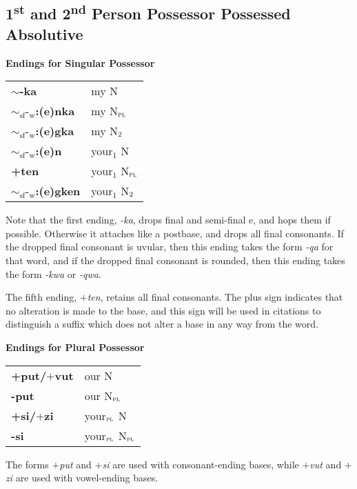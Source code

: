 \documentclass{article}
\begin{document}
\subsection{1\textsuperscript{st} and 2\textsuperscript{nd} Person Possessor Possessed Absolutive}

\textbf{Endings for Singular Possessor}

\begin{tabular}{ l l }
\textbf{$\sim$-ka} & my N \\ 
\textbf{${\sim}_\text{sf}\text{-}_\text{w}$:(e)nka} & my N$_\text{\textsc{pl}}$ \\  
\textbf{${\sim}_\text{sf}\text{-}_\text{w}$:(e)gka} & my N$_\text{\textsc{2}}$ \\  
\textbf{${\sim}_\text{sf}\text{-}_\text{w}$:(e)n} & your$_1$ N \\  
\textbf{+ten} & your$_1$ N$_\text{\textsc{pl}}$ \\
\textbf{${\sim}_\text{sf}\text{-}_\text{w}$:(e)gken} & your$_1$ N$_\text{\textsc{2}}$ \\  
\end{tabular}

\vspace{12pt}

Note that the first ending, \textit{-ka}, drops final and semi-final e, and hops them if possible.
%
Otherwise it attaches like a postbase, and drops all final consonants.
%
If the dropped final consonant is uvular, then this ending takes the form \textit{-qa} for that word, and if the dropped final consonant is rounded, then this ending takes the form \textit{-kwa} or \textit{-qwa}.

The fifth ending, \textit{$+$ten}, retains all final consonants.
%
The plus sign indicates that no alteration is made to the base, and this sign will be used in citations to distinguish a suffix which does not
alter a base in any way from the word.

\vspace{12pt}

\noindent \textbf{Endings for Plural Possessor}

\begin{tabular}{ l l }
\textbf{+put/$+$vut} & our N \\ 
\textbf{-put} & our N$_\text{\textsc{pl}}$ \\ 
\textbf{+si/$+$zi} & your$_\text{\textsc{pl}}$ N \\ 
\textbf{-si} & your$_\text{\textsc{pl}}$ N$_\text{\textsc{pl}}$ \\ 
\end{tabular}

\vspace{12pt}

The forms \textit{$+$put} and \textit{$+$si} are used with consonant-ending bases, while \textit{$+$vut} and \textit{$+$zi} are used with vowel-ending bases.
\end{document}
